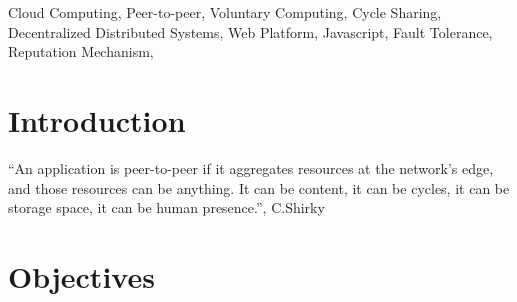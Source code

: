 \documentclass{./llncs2e/llncs}
\begin{document}
\begin{keywords}
Cloud Computing, Peer-to-peer, Voluntary Computing, Cycle Sharing, Decentralized Distributed Systems, Web Platform, Javascript, Fault Tolerance, Reputation Mechanism, 
\end{keywords}




% 
% 

\section{Introduction}





  ``An application is peer-to-peer if it aggregates resources at the network’s edge, and those resources can be anything. It can be content, it can be cycles, it can be storage space, it can be human presence.'', C.Shirky \cite{Shirky.}










% 
% 

\section{Objectives}
\end{document}
